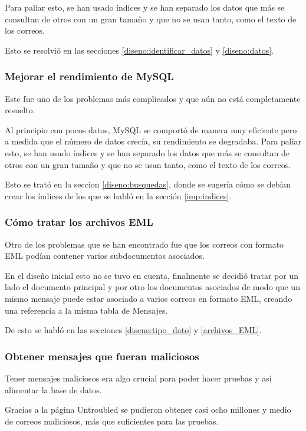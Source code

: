 Para paliar esto, se han usado índices y se han separado los datos que más se consultan de otros con un gran tamaño y que no se usan tanto, como el texto de los correos.

Esto se resolvió en las secciones \ref{diseno:identificar_datos} y \ref{diseno:datos}.

\subsubsection{Mejorar el rendimiento de MySQL}
Este fue uno de los problemas más complicados y que aún no está completamente resuelto. 

Al principio con pocos datos, MySQL se comportó de manera muy eficiente pero a medida que el número de datos crecía, su rendimiento se degradaba. Para paliar esto, se han usado índices y se han separado los datos que más se consultan de otros con un gran tamaño y que no se usan tanto, como el texto de los correos. 

Esto se trató en la seccion \ref{diseno:busquedas}, donde se sugería cómo se debían crear los índices de los que se habló en la sección \ref{imp:indices}.

\subsubsection{Cómo tratar los archivos EML}
Otro de los problemas que se han encontrado fue que los correos con formato EML podían contener varios subdocumentos asociados.

En el diseño inicial esto no se tuvo en cuenta, finalmente se decidió tratar por un lado el documento principal y por otro los documentos asociados de modo que un mismo mensaje puede estar asociado a varios correos en formato EML, creando una referencia a la misma tabla de Mensajes.

De esto se habló en las secciones \ref{diseno:tipo_dato} y \ref{archivos_EML}. 

\subsubsection{Obtener mensajes que fueran maliciosos}

Tener mensajes maliciosos era algo crucial para poder hacer pruebas y así alimentar la base de datos. 

Gracias a la página Untroubled \cite{untroubled} se pudieron obtener casi ocho millones y medio de correos maliciosos, más que suficientes para las pruebas. 

